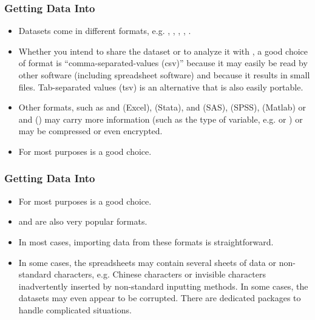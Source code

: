 
\begin{frame}[label=TitlePage]
\maketitle%
\end{frame}


\begin{frame}[fragile]
\frametitle{Getting Data Into \Rlogo}
\begin{itemize}
\item Datasets come in different formats, e.g. , , , , . 
\item Whether you intend to share the dataset or to analyze it with \Rlogo, a good choice of format is ``comma-separated-values (csv)'' because it may easily be read by other software (including spreadsheet software) and because it results in small files. Tab-separated values (tsv) is an alternative that is also easily portable. 
\item Other formats, such as  and  (Excel),  (Stata),  and  (SAS),  (SPSS),  (Matlab) or  and  (\Rlogo) may carry more information (such as the type of variable, e.g.  or ) or may be compressed or even encrypted.
\item For most purposes  is a good choice.
\end{itemize}
\end{frame}


\begin{frame}[fragile]
\frametitle{Getting Data Into \Rlogo}
\begin{itemize}
\item For most purposes  is a good choice. 
\item {} and  are also very popular formats. 
\item In most cases, importing data from these formats is straightforward. 
\item In some cases, the spreadsheets may contain several sheets of data or non-standard characters, e.g. Chinese characters or invisible characters inadvertently inserted by non-standard inputting methods. In some cases, the datasets may even appear to be corrupted. There are dedicated packages to handle complicated situations. 
\end{itemize}
\end{frame}


